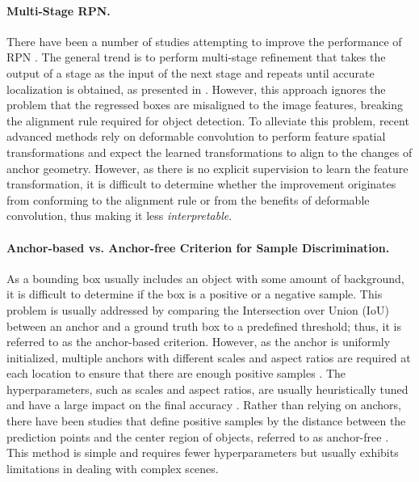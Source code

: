 \documentclass{article}
\begin{document}
	\paragraph{Multi-Stage RPN.} There have been a number of studies attempting to improve the performance of RPN \citep{gidaris2016attend,wang2019region,yang2016craft,zhong2017cascade}. The general trend is to perform multi-stage refinement that takes the output of a stage as the input of the next stage and repeats until accurate localization is obtained, as presented in \citep{gidaris2016attend}. However, this approach ignores the problem that the regressed boxes are misaligned to the image features, breaking the alignment rule required for object detection. To alleviate this problem, recent advanced methods \citep{fan2019seamese, wang2019region} rely on deformable convolution \citep{Dai_2017_ICCV} to perform feature spatial transformations and expect the learned transformations to align to the changes of anchor geometry. However, as there is no explicit supervision to learn the feature transformation, it is difficult to determine whether the improvement originates from conforming to the alignment rule or from the benefits of deformable convolution, thus making it less \textit{interpretable}.
	
	\paragraph{Anchor-based vs. Anchor-free Criterion for Sample Discrimination.} As a bounding box usually includes an object with some amount of background, it is difficult to determine if the box is a positive or a negative sample. This problem is usually addressed by comparing the Intersection over Union (IoU) between an anchor and a ground truth box to a predefined threshold; thus, it is referred to as the anchor-based criterion. However, as the anchor is uniformly initialized, multiple anchors with different scales and aspect ratios are required at each location to ensure that there are enough positive samples \citep{NIPS2015_5638}. The hyperparameters, such as scales and aspect ratios, are usually heuristically tuned and have a large impact on the final accuracy \citep{Lin_2017_ICCV, NIPS2015_5638}. Rather than relying on anchors, there have been studies that define positive samples by the distance between the prediction points and the center region of objects, referred to as anchor-free \citep{FCOS, unitbox, FSAF}. This method is simple and requires fewer hyperparameters but usually exhibits limitations in dealing with complex scenes. 
	
\end{document}
